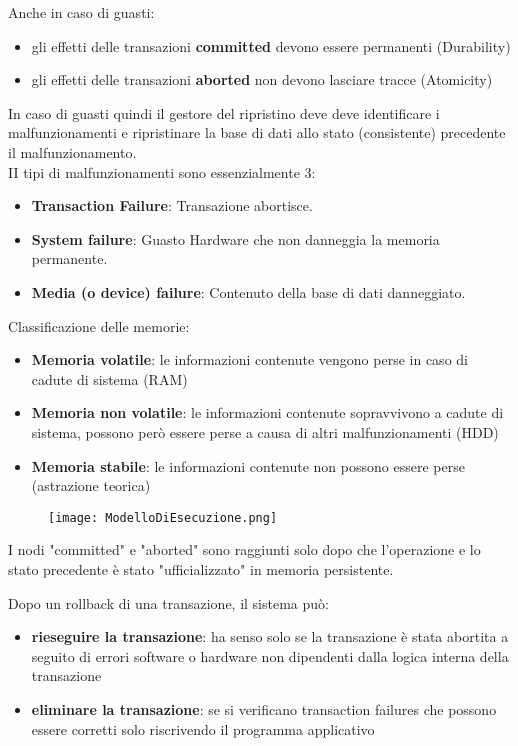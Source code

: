 Anche in caso di guasti:
\begin{itemize}
    \item gli effetti delle transazioni \textbf{committed} devono essere permanenti (Durability)
    \item gli effetti delle transazioni \textbf{aborted} non devono lasciare tracce (Atomicity)
\end{itemize}
In caso di guasti quindi il gestore del ripristino deve deve identificare i malfunzionamenti e ripristinare la base di dati allo stato (consistente) precedente il malfunzionamento.\\
II tipi di malfunzionamenti sono essenzialmente 3:
\begin{itemize}
    \item \textbf{Transaction Failure}: Transazione abortisce.
    \item \textbf{System failure}: Guasto Hardware che non danneggia la memoria permanente.
    \item \textbf{Media (o device) failure}: Contenuto della base di dati danneggiato.
\end{itemize}
Classificazione delle memorie:
\begin{itemize}
    \item \textbf{Memoria volatile}: le informazioni contenute vengono perse in caso di cadute di sistema (RAM)
    \item \textbf{Memoria non volatile}: le informazioni contenute sopravvivono a cadute di sistema, possono però essere perse a causa di altri malfunzionamenti (HDD)
    \item \textbf{Memoria stabile}: le informazioni contenute non possono essere perse (astrazione teorica)
\end{itemize}
\begin{figure}[H]
    \centering
    \texttt{[image: ModelloDiEsecuzione.png]}
    \label{fig:ModelloDiEsecuzione}
\end{figure}
I nodi "committed" e "aborted" sono raggiunti solo dopo che l'operazione e lo stato precedente \`e stato "ufficializzato" in memoria persistente.

\break
\noindent Dopo un rollback di una transazione, il sistema può:
\begin{itemize}
    \item \textbf{rieseguire la transazione}: ha senso solo se la transazione è stata abortita a seguito di errori software o hardware non dipendenti dalla logica interna della transazione
    
    \item \textbf{eliminare la transazione}: se si verificano transaction failures che possono essere corretti solo riscrivendo il programma applicativo
\end{itemize}

